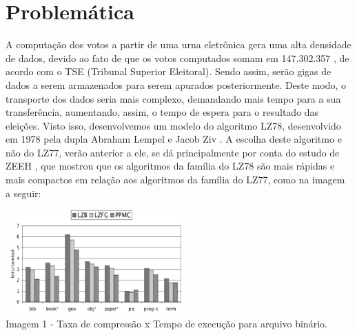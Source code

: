 \documentclass[
	article,			
	11pt,				
	oneside,			
	a4paper,			
	english,			
	brazil,				
	sumario=tradicional
	]{abntex2}
\begin{document}
\section{Problemática}
A computação dos votos a partir de uma urna eletrônica gera uma alta densidade de dados, devido ao fato de que os votos computados somam em 147.302.357 \cite{eleitores2018}, de acordo com o TSE (Tribunal Superior Eleitoral). Sendo assim, serão gigas de dados a serem armazenados para serem apurados posteriormente. Deste modo, o transporte dos dados seria mais complexo, demandando mais tempo para a sua transferência, aumentando, assim, o tempo de espera para o resultado das eleições. Visto isso, desenvolvemos um modelo do algoritmo LZ78, desenvolvido em 1978 pela dupla Abraham Lempel e Jacob Ziv \cite{christinazeeh2013}.
A escolha deste algoritmo e não do LZ77, verão anterior a ele, se dá principalmente por conta do estudo de ZEEH \cite{christinazeeh2013}, que mostrou que os algoritmos da família do LZ78 são mais rápidas e mais compactos em relação aos algoritmos da família do LZ77, como na imagem a seguir: 
\begin{center}
	\includegraphics[width=7cm,height=4cm]{LZ77_LZ78.png}\\
	Imagem 1 - Taxa de compressão x Tempo de execução para arquivo binário.
\end{center}
\end{document}
